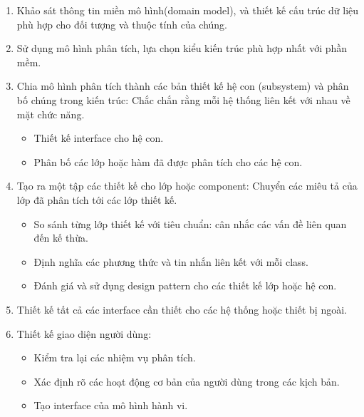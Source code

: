 \documentclass[./../SoftwareEngineering.tex]{subfiles}
\begin{document}
	\begin{minipage}{\textwidth}
		\begin{enumerate}
			\item Khảo sát thông tin miền mô hình(domain model), và thiết kế cấu trúc dữ liệu phù hợp cho đối tượng và thuộc tính của chúng. 
			
			\item Sử dụng mô hình phân tích, lựa chọn kiểu kiến trúc phù hợp nhất với phần mềm.
			
			\item Chia mô hình phân tích thành các bản thiết kế hệ con (subsystem) và phân bố chúng trong kiến trúc: Chắc chắn rằng mỗi hệ thống liên kết với nhau về mặt chức năng.
			\begin{itemize}
				\item Thiết kế interface cho hệ con.
				
				\item Phân bố các lớp hoặc hàm đã được phân tích cho các hệ con.
			\end{itemize}
			
			\item Tạo ra một tập các thiết kế cho lớp hoặc component: Chuyển các miêu tả của lớp đã phân tích tới các lớp thiết kế.
			\begin{itemize}
				\item So sánh từng lớp thiết kế với tiêu chuẩn: cân nhắc các vấn đề liên quan đến  kế thừa.
				
				\item Định nghĩa các phương thức và tin nhắn liên kết với mỗi class.
				
				\item Đánh giá và sử dụng design pattern cho các thiết kế lớp hoặc hệ con.
				
				
			\end{itemize}
			
			\item Thiết kế tất cả các interface cần thiết cho các hệ thống hoặc thiết bị ngoài.
			
			\item Thiết kế giao diện người dùng:
			\begin{itemize}
				\item Kiểm tra lại các nhiệm vụ phân tích.
				
				\item Xác định rõ các hoạt động cơ bản của người dùng trong các kịch bản.
				
				\item Tạo interface của mô hình hành vi.
				

\end{itemize}
\end{enumerate}
\end{minipage}
\end{document}
